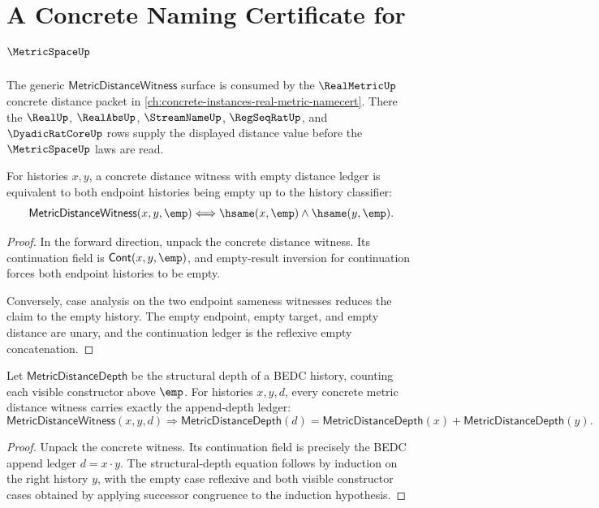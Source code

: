 \chapter{A Concrete Naming Certificate for \(\MetricSpaceUp\)}
\label{ch:concrete-instances-metric-namecert}



The generic $\mathsf{MetricDistanceWitness}$ surface is consumed by the $\RealMetricUp$ concrete distance packet in \autoref{ch:concrete-instances-real-metric-namecert}. There the $\RealUp$, $\RealAbsUp$, $\StreamNameUp$, $\RegSeqRatUp$, and $\DyadicRatCoreUp$ rows supply the displayed distance value before the $\MetricSpaceUp$ laws are read.

\begin{theorem}
\label{thm:metric-distance-witness-empty-distance-iff}
For histories $x,y$, a concrete distance witness with empty distance ledger is
equivalent to both endpoint histories being empty up to the history classifier:
$$
\mathsf{MetricDistanceWitness}(x,y,\emp)
\Longleftrightarrow
\hsame(x,\emp)\wedge\hsame(y,\emp).
$$
\end{theorem}
\begin{proof}
In the forward direction, unpack the concrete distance witness. Its
continuation field is $\mathsf{Cont}(x,y,\emp)$, and empty-result inversion for
continuation forces both endpoint histories to be empty.

Conversely, case analysis on the two endpoint sameness witnesses reduces the
claim to the empty history. The empty endpoint, empty target, and empty distance
are unary, and the continuation ledger is the reflexive empty concatenation.
\end{proof}

\begin{theorem}
\label{thm:metric-distance-witness-depth-add}
Let $\mathsf{MetricDistanceDepth}$ be the structural depth of a BEDC history,
counting each visible constructor above $\emp$. For histories $x,y,d$, every
concrete metric distance witness carries exactly the append-depth ledger:
$$
\mathsf{MetricDistanceWitness}(x,y,d)
\Longrightarrow
\mathsf{MetricDistanceDepth}(d)
=
\mathsf{MetricDistanceDepth}(x)+\mathsf{MetricDistanceDepth}(y).
$$
\end{theorem}
\begin{proof}
Unpack the concrete witness. Its continuation field is precisely the BEDC
append ledger $d=x\cdot y$. The structural-depth equation follows by induction
on the right history $y$, with the empty case reflexive and both visible
constructor cases obtained by applying successor congruence to the induction
hypothesis.
\end{proof}


